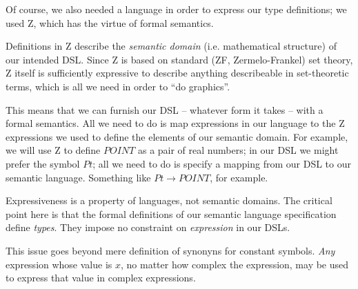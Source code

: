\documentclass[12pt]{tufte-handout}
\numberwithin{equation}{subsection}
\numberwithin{equation}{subsection}
\begin{document}
Of course, we also needed a language in order to express our type
definitions; we used Z, which has the virtue of formal semantics.

Definitions in Z describe the \textit{semantic domain}
(i.e. mathematical structure) of our intended DSL.  Since Z is based
on standard (ZF, Zermelo-Frankel) set theory, Z itself is sufficiently
expressive to describe anything describeable in set-theoretic terms,
which is all we need in order to ``do graphics''.

This means that we can furnish our DSL -- whatever form it takes --
with a formal semantics.  All we need to do is map expressions in our
language to the Z expressions we used to define the elements of our
semantic domain.  For example, we will use Z to define \(POINT\) as a
pair of real numbers; in our DSL we might prefer the symbol \(Pt\);
all we need to do is specify a mapping from our DSL to our semantic
language. Something like \(Pt\rightarrow POINT\), for
example.

Expressiveness is a property of languages, not semantic domains.  The
critical point here is that the formal definitions of our semantic
language specification define \textit{types}.  They impose no
constraint on \textit{expression} in our DSLs.

This issue goes beyond mere definition of synonyns for constant
symbols.  \textit{Any} expression whose value is \(x\), no matter how
complex the expression, may be used to express that value in complex
expressions.

\end{document}
